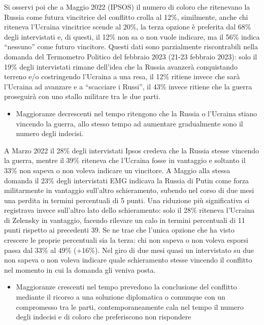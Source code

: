 \documentclass[
  openany]{book}
\providecommand{\tightlist}{%
  \setlength{\itemsep}{0pt}\setlength{\parskip}{0pt}}
\begin{document}
Si osservi poi che a Maggio 2022 (IPSOS) il numero di coloro che ritenevano la Russia come futura vincitrice del conflitto crolla al 12\%, similmente, anche chi riteneva l'Ucraina vincitrice scende al 20\%, la terza opzione è preferita dal 68\% degli intervistati e, di questi, il 12\% non sa o non vuole indicare, ma il 56\% indica ``nessuno'' come futuro vincitore. Questi dati sono parzialmente riscontrabili nella domanda del Termometro Politico del febbraio 2023 (21-23 febbraio 2023): solo il 19\% degli intervistati rimane dell'idea che la Russia avanzerà conquistando terreno e/o costringendo l'Ucraina a una resa, il 12\% ritiene invece che sarà l'Ucraina ad avanzare e a ``scacciare i Russi'', il 43\% invece ritiene che la guerra proseguirà con uno stallo militare tra le due parti.

\begin{itemize}
\tightlist
\item
  Maggioranze decrescenti nel tempo ritengono che la Russia o l'Ucraina stiano vincendo la guerra, allo stesso tempo ad aumentare gradualmente sono il numero degli indecisi.
\end{itemize}

A Marzo 2022 il 28\% degli intervistati Ipsos credeva che la Russia stesse vincendo la guerra, mentre il 39\% riteneva che l'Ucraina fosse in vantaggio e soltanto il 33\% non sapeva o non voleva indicare un vincitore. A Maggio alla stessa domanda il 23\% degli intervistati EMG indicava la Russia di Putin come forza militarmente in vantaggio sull'altro schieramento, subendo nel corso di due mesi una perdita in termini percentuali di 5 punti. Una riduzione più significativa si registrava invece sull'altro lato dello schieramento: solo il 28\% riteneva l'Ucraina di Zelensky in vantaggio, facendo rilevare un calo in termini percentuali di 11 punti rispetto ai precedenti 39. Se ne trae che l'unica opzione che ha visto crescere le proprie percentuali sia la terza: chi non sapeva o non voleva esporsi passa dal 33\% al 49\% (+16\%). Nel giro di due mesi quasi un intervistato su due non sapeva o non voleva indicare quale schieramento stesse vincendo il conflitto nel momento in cui la domanda gli veniva posta.

\begin{itemize}
\tightlist
\item
  Maggioranze crescenti nel tempo prevedono la conclusione del conflitto mediante il ricorso a una soluzione diplomatica o comunque con un compromesso tra le parti, contemporaneamente cala nel tempo il numero degli indecisi e di coloro che preferiscono non rispondere
\end{itemize}
\end{document}
